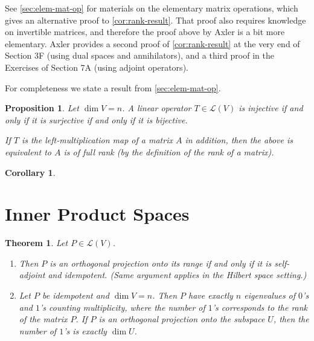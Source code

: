 \documentclass[11pt]{article}
\numberwithin{equation}{section}
\theoremstyle{plain-star}
\newtheorem{thm}[equation]{Theorem}
\newtheorem{prop}[equation]{Proposition}
\newtheorem{cor}[equation]{Corollary}
\theoremstyle{definition-star}
\theoremstyle{remark-star}
\theoremstyle{plain-star}
\newcommand{\LV}{\mathcal{L}(V)}
\begin{document}
See \cref{sec:elem-mat-op} for materials on the elementary matrix operations, which gives an alternative proof to \cref{cor:rank-result}. That proof also requires knowledge on invertible matrices, and therefore the proof above by Axler is a bit more elementary. Axler provides a second proof of \cref{cor:rank-result} at the very end of Section 3F (using dual spaces and annihilators), and a third proof in the Exercises of Section 7A (using adjoint operators).

For completeness we state a result from \cref{sec:elem-mat-op}.

\begin{prop}
    Let $\dim V = n$. A linear operator $T \in \LV$ is injective if and only if it is surjective if and only if it is bijective.

    If $T$ is the left-multiplication map of a matrix $A$ in addition, then the above is equivalent to $A$ is of full rank (by the definition of the rank of a matrix).
\end{prop}
\begin{cor}
    
\end{cor}

\section{Inner Product Spaces}
\begin{thm} Let $P\in \LV$.
    \begin{enumerate}
        \item Then $P$ is an orthogonal projection onto its range if and only if it is self-adjoint and idempotent. (Same argument applies in the Hilbert space setting.)
        \item Let $P$ be idempotent and $\dim V = n$. Then $P$ have exactly $n$ eigenvalues of $0$'s and $1$'s counting multiplicity, where the number of $1$'s corresponds to the rank of the matrix $P$. If $P$ is an orthogonal projection onto the subspace $U$, then the number of $1$'s is exactly $\dim U$.
    \end{enumerate}
\end{thm}
\end{document}
